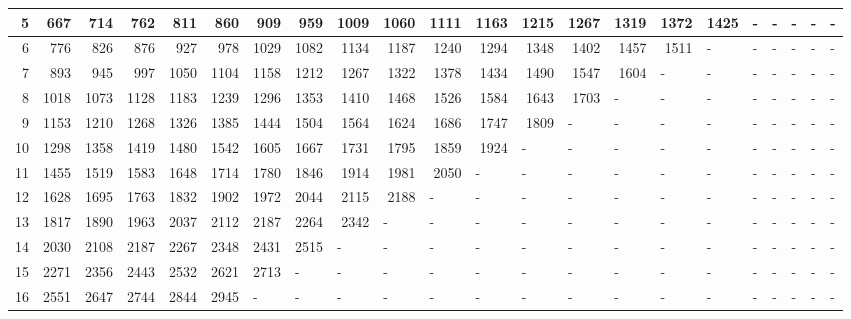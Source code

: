 \begin{appendices}
\begin{table}[H]
\begin{minipage}[b]{8.5cm}
\begin{turn}{90}
{\begin{tabular}{|r|r|r|r|r|r|r|r|r|r|r|r|l|l|l|l|l|l|l|l|l|l|}
5 & 667 & 714 & 762 & 811 & 860 & 909 & 959 & 1009 & 1060 & 1111 & 1163 & \multicolumn{1}{r|}{1215} & \multicolumn{1}{r|}{1267} & \multicolumn{1}{r|}{1319} & \multicolumn{1}{r|}{1372} & \multicolumn{1}{r|}{1425} & - & - & - & - & - \\ \hline
6 & 776 & 826 & 876 & 927 & 978 & 1029 & 1082 & 1134 & 1187 & 1240 & 1294 & \multicolumn{1}{r|}{1348} & \multicolumn{1}{r|}{1402} & \multicolumn{1}{r|}{1457} & \multicolumn{1}{r|}{1511} & - & - & - & - & - & - \\ \hline
7 & 893 & 945 & 997 & 1050 & 1104 & 1158 & 1212 & 1267 & 1322 & 1378 & 1434 & \multicolumn{1}{r|}{1490} & \multicolumn{1}{r|}{1547} & \multicolumn{1}{r|}{1604} & - & - & - & - & - & - & - \\ \hline
8 & 1018 & 1073 & 1128 & 1183 & 1239 & 1296 & 1353 & 1410 & 1468 & 1526 & 1584 & \multicolumn{1}{r|}{1643} & \multicolumn{1}{r|}{1703} & - & - & - & - & - & - & - & - \\ \hline
9 & 1153 & 1210 & 1268 & 1326 & 1385 & 1444 & 1504 & 1564 & 1624 & 1686 & 1747 & \multicolumn{1}{r|}{1809} & - & - & - & - & - & - & - & - & - \\ \hline
10 & 1298 & 1358 & 1419 & 1480 & 1542 & 1605 & 1667 & 1731 & 1795 & 1859 & 1924 & - & - & - & - & - & - & - & - & - & - \\ \hline
11 & 1455 & 1519 & 1583 & 1648 & 1714 & 1780 & 1846 & 1914 & 1981 & 2050 & \multicolumn{1}{l|}{-} & - & - & - & - & - & - & - & - & - & - \\ \hline
12 & 1628 & 1695 & 1763 & 1832 & 1902 & 1972 & 2044 & 2115 & 2188 & \multicolumn{1}{l|}{-} & \multicolumn{1}{l|}{-} & - & - & - & - & - & - & - & - & - & - \\ \hline
13 & 1817 & 1890 & 1963 & 2037 & 2112 & 2187 & 2264 & 2342 & \multicolumn{1}{l|}{-} & \multicolumn{1}{l|}{-} & \multicolumn{1}{l|}{-} & - & - & - & - & - & - & - & - & - & - \\ \hline
14 & 2030 & 2108 & 2187 & 2267 & 2348 & 2431 & 2515 & \multicolumn{1}{l|}{-} & \multicolumn{1}{l|}{-} & \multicolumn{1}{l|}{-} & \multicolumn{1}{l|}{-} & - & - & - & - & - & - & - & - & - & - \\ \hline
15 & 2271 & 2356 & 2443 & 2532 & 2621 & 2713 & \multicolumn{1}{l|}{-} & \multicolumn{1}{l|}{-} & \multicolumn{1}{l|}{-} & \multicolumn{1}{l|}{-} & \multicolumn{1}{l|}{-} & - & - & - & - & - & - & - & - & - & - \\ \hline
16 & 2551 & 2647 & 2744 & 2844 & 2945 & \multicolumn{1}{l|}{-} & \multicolumn{1}{l|}{-} & \multicolumn{1}{l|}{-} & \multicolumn{1}{l|}{-} & \multicolumn{1}{l|}{-} & \multicolumn{1}{l|}{-} & - & - & - & - & - & - & - & - & - & - \\ \hline

\end{tabular}}
\end{turn}
\end{minipage}
\end{table}
\end{appendices}
